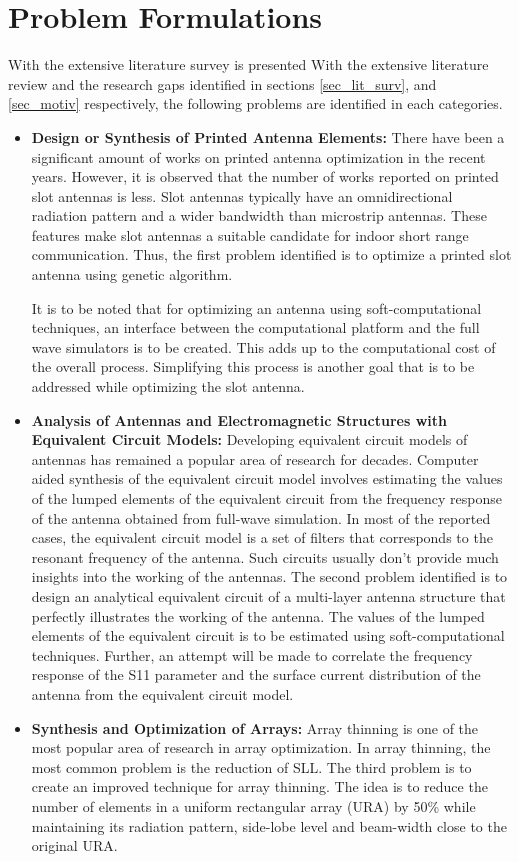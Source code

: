 \section{Problem Formulations}
With the extensive literature survey is presented With the extensive literature review and the research gaps identified in sections \ref{sec_lit_surv}, and \ref{sec_motiv} respectively, the following problems are identified in each categories.

\begin{itemize}
\item \textbf{Design or Synthesis of Printed Antenna Elements:} There have been a significant amount of works on printed antenna optimization in the recent years. However, it is observed that the number of works reported on printed slot antennas is less. Slot antennas typically have an omnidirectional radiation pattern and a wider bandwidth than microstrip antennas. These features make slot antennas a suitable candidate for indoor short range communication. Thus, the first problem identified is to optimize a printed slot antenna using genetic algorithm.

    It is to be noted that for optimizing an antenna using soft-computational techniques, an interface between the computational platform and the full wave simulators is to be created. This adds up to the computational cost of the overall process. Simplifying this process is another goal that is to be addressed while optimizing the slot antenna.
\item \textbf{Analysis of Antennas and Electromagnetic Structures with Equivalent Circuit Models:} Developing equivalent circuit models of antennas has remained a popular area of research for decades. Computer aided synthesis of the equivalent circuit model involves estimating the values of the lumped elements of the equivalent circuit from the frequency response of the antenna obtained from full-wave simulation. In most of the reported cases, the equivalent circuit model is a set of filters that corresponds to the resonant frequency of the antenna. Such circuits usually don't provide much insights into the working of the antennas. The second problem identified is to design an analytical equivalent circuit of a multi-layer antenna structure that perfectly illustrates the working of the antenna. The values of the lumped elements of the equivalent circuit is to be estimated using soft-computational techniques. Further, an attempt will be made to correlate the frequency response of the S11 parameter and the surface current distribution of the antenna from the equivalent circuit model.
\item \textbf{Synthesis and Optimization of Arrays:} Array thinning is one of the most popular area of research in array optimization. In array thinning, the most common problem is the reduction of SLL. The third problem is to create an improved technique for array thinning. The idea is to reduce the number of elements in a uniform rectangular array (URA) by 50\% while maintaining its radiation pattern, side-lobe level and beam-width close to the original URA.


\end{itemize}

